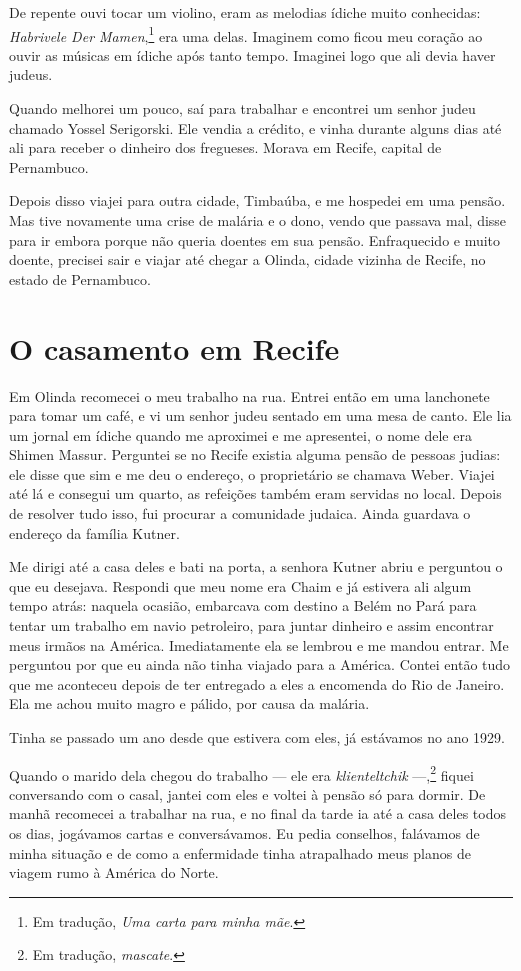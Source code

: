 De repente ouvi tocar um violino, eram
as melodias ídiche muito conhecidas: \textit{Habrivele Der Mamen},\footnote{Em tradução, \textit{Uma carta para minha mãe}.} era uma delas. Imaginem como ficou meu coração ao ouvir as músicas em ídiche após tanto tempo. Imaginei logo que ali devia haver judeus.

Quando melhorei um pouco, saí para trabalhar e encontrei um senhor judeu
chamado Yossel Serigorski. Ele vendia a crédito, e vinha durante alguns
dias até ali para receber o dinheiro dos fregueses. Morava em Recife, capital de Pernambuco.

Depois disso viajei para outra cidade, Timbaúba, e me hospedei em
uma pensão. Mas tive novamente uma crise de malária e o dono, vendo que passava mal, disse para ir embora porque não queria doentes
em sua pensão. Enfraquecido e muito doente, precisei sair e viajar até
chegar a Olinda, cidade vizinha de Recife, no estado de Pernambuco.

\chapter{O casamento em Recife}

Em Olinda recomecei o meu trabalho na rua. Entrei então em uma
lanchonete para tomar um café, e vi um senhor judeu sentado em uma mesa
de canto. Ele lia um jornal em ídiche quando me aproximei e me
apresentei, o nome dele era Shimen Massur. Perguntei se
no Recife existia alguma pensão de pessoas judias: ele disse que sim e
me deu o endereço, o proprietário se chamava Weber. Viajei até lá e
consegui um quarto, as refeições também eram servidas no local.
Depois de resolver tudo isso, fui procurar a comunidade judaica. Ainda
guardava o endereço da família Kutner.

Me dirigi até a casa deles e bati na porta, a senhora Kutner abriu e
perguntou o que eu desejava. Respondi que meu nome era Chaim e já estivera ali algum tempo
atrás: naquela ocasião, embarcava com destino a Belém no Pará para tentar um trabalho em navio petroleiro, para juntar dinheiro e assim encontrar meus irmãos na América. Imediatamente ela se
lembrou e me mandou entrar. Me perguntou por que eu ainda não tinha viajado para a América. 
Contei então tudo que me aconteceu depois de ter entregado a eles a encomenda do Rio de Janeiro. Ela me achou muito magro e pálido, por causa da malária.

Tinha se passado um ano desde que estivera com eles, já estávamos no ano
1929.

Quando o marido dela chegou do trabalho --- ele era \textit{klienteltchik} ---,\footnote{Em tradução, \textit{mascate}.} 
fiquei conversando com o casal, jantei com eles e
voltei à pensão só para dormir. De manhã recomecei a trabalhar na rua, e
no final da tarde ia até a casa deles todos os dias, jogávamos cartas e
conversávamos. Eu pedia conselhos, falávamos de minha situação e de como
a enfermidade tinha atrapalhado meus planos de viagem rumo à América do Norte.

